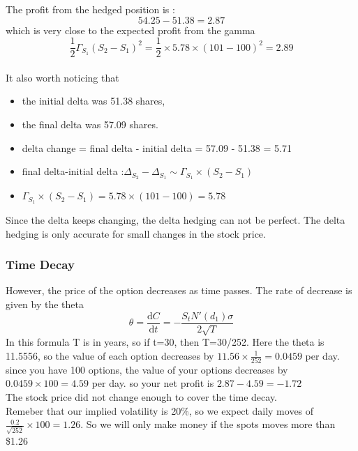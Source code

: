 \documentclass[12pt]{article}
\newcommand{\der}[2]{\frac{\mathrm{d}{#1}}{\mathrm{d}{#2}}}
\begin{document}
The profit from the hedged position is :
\[54.25 - 51.38 = 2.87\]
which is very close to the expected profit from the gamma
\[ \frac{1}{2}\Gamma_{S_1}(S_2-S_1)^2 =\frac{1}{2}\times 5.78\times(101-100)^2 = 2.89\]
\\ It also worth noticing that
\begin{itemize}
\item the initial delta was 51.38 shares,
\item the final delta was 57.09 shares.
\item delta change = final delta - initial delta = 57.09 - 51.38 = 5.71
\item final delta-initial delta :$\Delta_{S_2}-\Delta_{S_1}\sim \Gamma_{S_1}\times(S_2-S_1)$ 
\item $\Gamma_{S_1}\times(S_2-S_1)=5.78\times(101-100)=5.78 $
\end{itemize}
Since the delta keeps changing, the delta hedging can not be perfect. The delta hedging is only accurate for small changes in the stock price.
\subsubsection*{Time Decay}
However, the price of the option decreases as time passes. The rate of decrease is given by the theta
\[\theta = \der{C}{t} = -\frac{S_tN'(d_1)\sigma}{2\sqrt{T}}\]
In this formula T is in years, so if t=30, then T=30/252.
Here the theta is 11.5556, so the value of each option decreases by $11.56\times\frac{1}{252}=0.0459$ per day.
\\since you have 100 options, the value of your options decreases by $0.0459\times 100 = 4.59$ per day.
so your net profit is $2.87 - 4.59 = -1.72$
\\The stock price did not change enough to cover the time decay.
\\Remeber that our implied volatility is 20\%, so we expect daily moves of $\frac{0.2}{\sqrt{252}}\times 100 = 1.26$. So we will only make money if the spots moves more than \$1.26 
\end{document}

